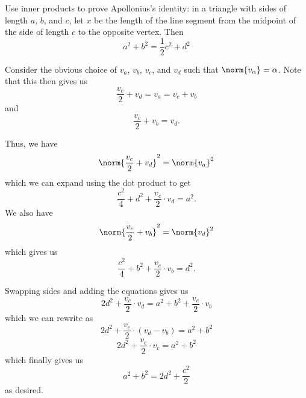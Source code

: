 \documentclass[12pt,letterpaper]{hmcpset}
\begin{document}
\begin{problem}[31]
	Use inner products to prove Apollonius's identity: in a triangle with sides of length $a$, $b$, and $c$, let $x$ be the length of the line segment from the midpoint of the side of length $c$ to the opposite vertex. Then 
	\[
		a^2 + b^2 = \frac{1}{2} c^2 + d^2
	\]
\end{problem}

\begin{solution}
	Consider the obvious choice of $v_a$, $v_b$, $v_c$, and $v_d$ such that \( \norm{v_\alpha} = \alpha \). Note that this then gives us
	\[
		\frac{v_c}{2} + v_d = v_a = v_c + v_b
	\]
	and
	\[
		\frac{v_c}{2} + v_b = v_d.
	\]
	
	Thus, we have 
	\[
		\norm{\frac{v_c}{2} + v_d}^2 = \norm{v_a}^2
	\]
	which we can expand using the dot product to get
	\[
		\frac{c^2}{4} + d^2 + \frac{v_c}{2} \cdot v_d = a^2.
	\]
	We also have 
	\[
		\norm{\frac{v_c}{2} + v_b}^2 = \norm{v_d}^2
	\]
	which gives us
	\[
		\frac{c^2}{4} + b^2 + \frac{v_c}{2} \cdot v_b = d^2.
	\]
	
	Swapping sides and adding the equations gives us
	\[
		2d^2 + \frac{v_c}{2} \cdot v_d = a^2 + b^2 + \frac{v_c}{2} \cdot v_b
	\]
	which we can rewrite as 
	\[
		2d^2 + \frac{v_c}{2} \cdot (v_d - v_b) = a^2 + b^2
	\]
	\[
		2d^2 + \frac{v_c}{2} \cdot v_c = a^2 + b^2
	\]
	which finally gives us
	\[
		a^2 + b^2 = 2d^2 + \frac{c^2}{2}
	\]
	as desired.
\end{solution}

\end{document}
